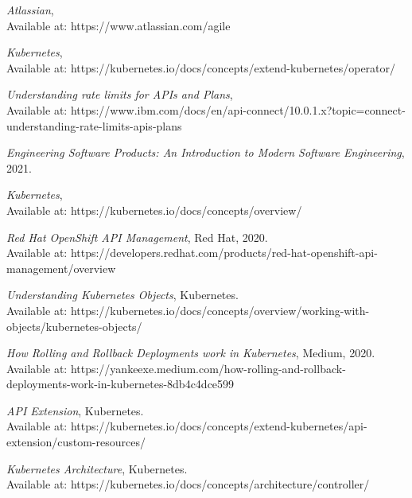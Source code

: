 \documentclass{article}
\begin{document}



\clearpage
\begin{thebibliography}{9}


\emph{Atlassian}, \\Available at: https://www.atlassian.com/agile 

\emph{Kubernetes}, \\Available at: https://kubernetes.io/docs/concepts/extend-kubernetes/operator/

\emph{Understanding rate limits for APIs and Plans}, \\Available at: https://www.ibm.com/docs/en/api-connect/10.0.1.x?topic=connect-understanding-rate-limits-apis-plans

\emph{Engineering Software Products: An Introduction to Modern Software Engineering}, 2021.
  
\emph{Kubernetes}, \\Available at: https://kubernetes.io/docs/concepts/overview/  

\emph{Red Hat OpenShift API Management}, Red Hat, 2020. \\Available at: https://developers.redhat.com/products/red-hat-openshift-api-management/overview

\emph{Understanding Kubernetes Objects}, Kubernetes. \\Available at: https://kubernetes.io/docs/concepts/overview/working-with-objects/kubernetes-objects/
  
\emph{How Rolling and Rollback Deployments work in Kubernetes}, Medium, 2020. \\Available at: https://yankeexe.medium.com/how-rolling-and-rollback-deployments-work-in-kubernetes-8db4c4dce599 

\emph{API Extension}, Kubernetes. \\Available at: https://kubernetes.io/docs/concepts/extend-kubernetes/api-extension/custom-resources/ 
  
\emph{Kubernetes Architecture}, Kubernetes. \\Available at: https://kubernetes.io/docs/concepts/architecture/controller/ 
  

\end{thebibliography}
\end{document}
